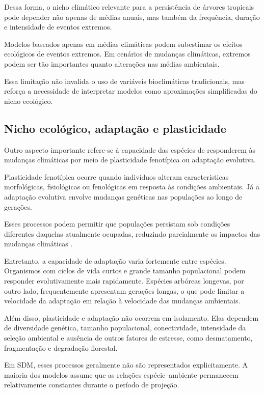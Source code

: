 Dessa forma, o nicho climático relevante para a persistência de árvores tropicais pode depender não apenas de médias anuais, mas também da frequência, duração e intensidade de eventos extremos.

\begin{atencao}
	Modelos baseados apenas em médias climáticas podem subestimar os efeitos ecológicos de eventos extremos. Em cenários de mudanças climáticas, extremos podem ser tão importantes quanto alterações nas médias ambientais.
\end{atencao}

Essa limitação não invalida o uso de variáveis bioclimáticas tradicionais, mas reforça a necessidade de interpretar modelos como aproximações simplificadas do nicho ecológico.

\subsection{Nicho ecológico, adaptação e plasticidade}

Outro aspecto importante refere-se à capacidade das espécies de responderem às mudanças climáticas por meio de plasticidade fenotípica ou adaptação evolutiva.

Plasticidade fenotípica ocorre quando indivíduos alteram características morfológicas, fisiológicas ou fenológicas em resposta às condições ambientais. Já a adaptação evolutiva envolve mudanças genéticas nas populações ao longo de gerações.

Esses processos podem permitir que populações persistam sob condições diferentes daquelas atualmente ocupadas, reduzindo parcialmente os impactos das mudanças climáticas \parencite{nicotra2010}.

Entretanto, a capacidade de adaptação varia fortemente entre espécies. Organismos com ciclos de vida curtos e grande tamanho populacional podem responder evolutivamente mais rapidamente. Espécies arbóreas longevas, por outro lado, frequentemente apresentam gerações longas, o que pode limitar a velocidade da adaptação em relação à velocidade das mudanças ambientais.

Além disso, plasticidade e adaptação não ocorrem em isolamento. Elas dependem de diversidade genética, tamanho populacional, conectividade, intensidade da seleção ambiental e ausência de outros fatores de estresse, como desmatamento, fragmentação e degradação florestal.

Em SDM, esses processos geralmente não são representados explicitamente. A maioria dos modelos assume que as relações espécie--ambiente permanecem relativamente constantes durante o período de projeção.

